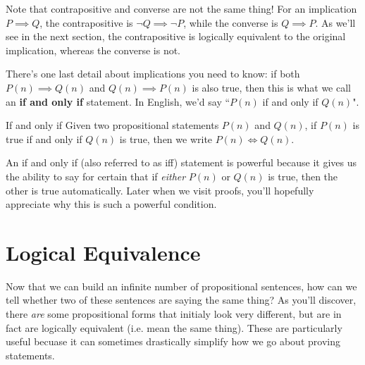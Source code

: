 \begin{warning}{}{}
	Note that contrapositive and converse are not the same thing! For an implication \( P \implies Q \), 
	the contrapositive is \( \neg Q \implies \neg P \), while the converse is \( Q \implies P \). As we'll 
	see in the next section, the contrapositive is logically equivalent to the original implication, 
	whereas the converse is not. 
\end{warning}
There's one last detail about implications you need to know: 
if both \( P(n) \implies Q(n) \) and \( Q(n) \implies P(n) \) is also true, then this is what we call an 
\textbf{if and only if} statement. In English, we'd say ``\( P(n) \) if and only if \( Q(n) \)". 
\begin{notation}{If and only if}{}
	Given two propositional statements \( P(n) \) and \( Q(n) \), if \( P(n) \) is true if and only if 
	\( Q(n) \) is true, then we write \( P(n) \iff Q(n) \). 
\end{notation}
An if and only if (also referred to as iff) statement is powerful because it gives us the ability to say 
for certain that if \textit{either} \( P(n) \) or \( Q(n) \) is true, then the other is true automatically. 
Later when we visit proofs, you'll hopefully appreciate why this is such a powerful condition.

\section{Logical Equivalence}
\label{Logical Equivalence}
Now that we can build an infinite number of propositional sentences, how can we tell whether two of these sentences
are saying the same thing? As you'll discover, there \textit{are} some 
propositional forms that initialy look very different, but are in fact are logically equivalent 
(i.e. mean the same thing). These are particularly useful becuase it can sometimes drastically simplify how we 
go about proving statements.     

